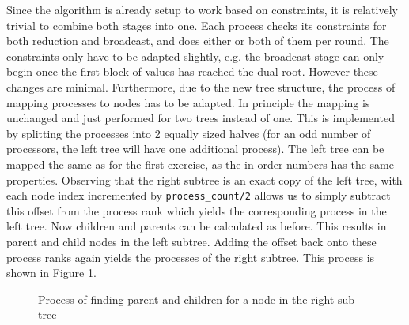 \documentclass[twoside,twocolumn,hidelinks]{article}
\begin{document}
Since the algorithm is already setup to work based on constraints, it is relatively trivial to combine both stages into one. Each process checks its constraints for both reduction and broadcast, and does either or both of them per round. The constraints only have to be adapted slightly, e.g. the broadcast stage can only begin once the first block of values has reached the dual-root. However these changes are minimal. Furthermore, due to the new tree structure, the process of mapping processes to nodes has to be adapted. In principle the mapping is unchanged and just performed for two trees instead of one. This is implemented by splitting the processes into 2 equally sized halves (for an odd number of processors, the left tree will have one additional process). The left tree can be mapped the same as for the first exercise, as the in-order numbers has the same properties. Observing that the right subtree is an exact copy of the left tree, with each node index incremented by \texttt{process\_count/2} allows us to simply subtract this offset from the process rank which yields the corresponding process in the left tree. Now children and parents can be calculated as before. This results in parent and child nodes in the left subtree. Adding the offset back onto these process ranks again yields the processes of the right subtree. This process is shown in Figure \ref{fig:dual_tree_translation}.

\begin{figure}
      \centering
      \caption{Process of finding parent and children for a node in the right sub tree}
      \label{fig:dual_tree_translation}
\end{figure}
\end{document}
